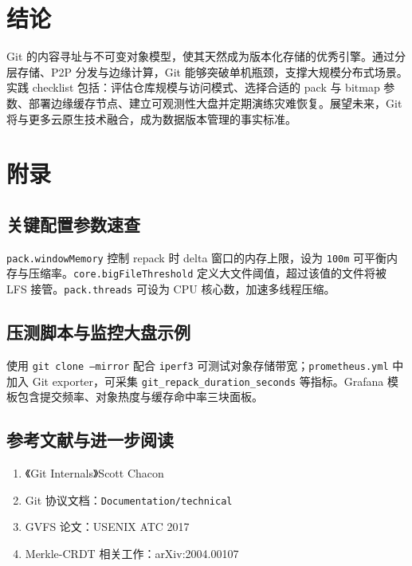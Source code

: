 \chapter{结论}
Git 的内容寻址与不可变对象模型，使其天然成为版本化存储的优秀引擎。通过分层存储、P2P 分发与边缘计算，Git 能够突破单机瓶颈，支撑大规模分布式场景。实践 checklist 包括：评估仓库规模与访问模式、选择合适的 pack 与 bitmap 参数、部署边缘缓存节点、建立可观测性大盘并定期演练灾难恢复。展望未来，Git 将与更多云原生技术融合，成为数据版本管理的事实标准。\par
\chapter{附录}
\section{关键配置参数速查}
\texttt{pack.windowMemory} 控制 repack 时 delta 窗口的内存上限，设为 \texttt{100m} 可平衡内存与压缩率。\texttt{core.bigFileThreshold} 定义大文件阈值，超过该值的文件将被 LFS 接管。\texttt{pack.threads} 可设为 CPU 核心数，加速多线程压缩。\par
\section{压测脚本与监控大盘示例}
使用 \texttt{git clone --mirror} 配合 \texttt{iperf3} 可测试对象存储带宽；\texttt{prometheus.yml} 中加入 Git exporter，可采集 \texttt{git\_{}repack\_{}duration\_{}seconds} 等指标。Grafana 模板包含提交频率、对象热度与缓存命中率三块面板。\par
\section{参考文献与进一步阅读}
\begin{enumerate}
\item 《Git Internals》Scott Chacon
\item Git 协议文档：\texttt{Documentation/technical}
\item GVFS 论文：USENIX ATC 2017
\item Merkle-CRDT 相关工作：arXiv:2004.00107
\end{enumerate}
